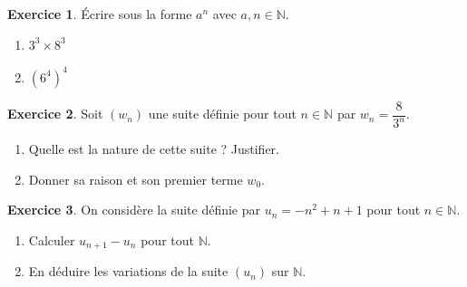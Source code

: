 \documentclass{exam}
\theoremstyle{definition}
\newtheorem{exercice}{Exercice}
\begin{document}
\large


\vspace{2mm}


\vspace{2mm}

\begin{exercice}
Écrire sous la forme $a^n$ avec $a, n \in \mathbb{N}$.
    \begin{enumerate}
        \item $3^3 \times 8^3$
        \item $(6^4)^4$
    \end{enumerate}
    \begin{center}
    \end{center}
\end{exercice}

\begin{exercice}
    Soit $(w_n)$ une suite définie pour tout $n \in \mathbb{N}$ par $w_n = \dfrac{8}{3^n}$.
    
    \begin{enumerate}
        \item Quelle est la nature de cette suite ? Justifier.
        \item Donner sa raison et son premier terme $w_0$.
    \end{enumerate}
    \begin{center}
    \end{center}
\end{exercice}

\begin{exercice}
    On considère la suite définie par $u_n = -n^2 + n + 1$ pour tout $n \in \mathbb{N}$.
    
    \begin{enumerate}
        \item Calculer $u_{n+1} - u_n$ pour tout $\mathbb{N}$.
        \item En déduire les variations de la suite $(u_n)$ sur $\mathbb{N}$.
    \end{enumerate}
    \begin{center}
    \end{center}
\end{exercice}
\end{document}
